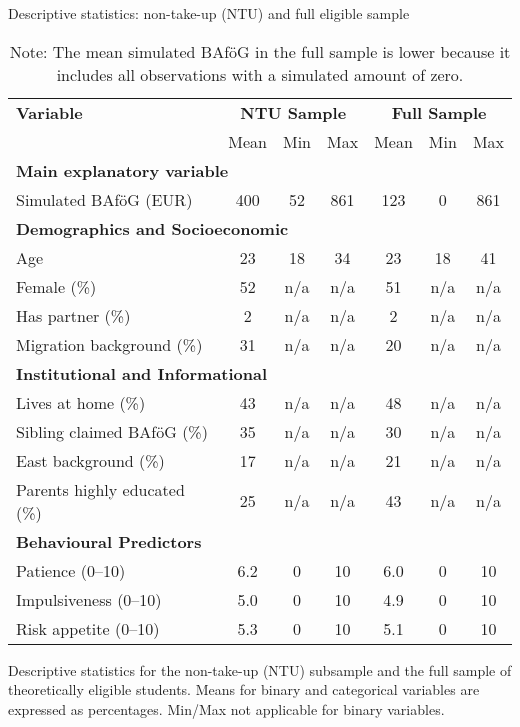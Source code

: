 \begin{table}[H]
\footnotesize
\caption*{Descriptive statistics: non-take-up (NTU) and full eligible sample}
\centering
\begin{tabular}{p{8cm}ccc|ccc}
\toprule
\textbf{Variable} & \multicolumn{3}{c|}{\textbf{NTU Sample}} & \multicolumn{3}{c}{\textbf{Full Sample}} \\
& Mean & Min & Max & Mean & Min & Max \\
\midrule
\multicolumn{7}{l}{\textbf{Main explanatory variable}} \\
Simulated BAföG (EUR)       & 400    & 52    & 861   & 123    & 0    & 861   \\
\midrule
\multicolumn{6}{l}{\textbf{Demographics and Socioeconomic}} \\
Age                         & 23     & 18    & 34    & 23     & 18   & 41    \\
Female (\%)                 & 52     & n/a   & n/a   & 51     & n/a  & n/a   \\
Has partner (\%)            & 2      & n/a   & n/a   & 2      & n/a  & n/a   \\
Migration background (\%)   & 31     & n/a   & n/a   & 20     & n/a  & n/a   \\
\midrule
\multicolumn{6}{l}{\textbf{Institutional and Informational}} \\
Lives at home (\%)          & 43     & n/a   & n/a   & 48     & n/a  & n/a   \\
Sibling claimed BAföG (\%)  & 35     & n/a   & n/a   & 30     & n/a  & n/a   \\
East background (\%)        & 17     & n/a   & n/a   & 21     & n/a  & n/a   \\
Parents highly educated (\%)& 25     & n/a   & n/a   & 43     & n/a  & n/a   \\
\midrule
\multicolumn{6}{l}{\textbf{Behavioural Predictors}} \\
Patience (0--10)            & 6.2    & 0     & 10    & 6.0    & 0    & 10    \\
Impulsiveness (0--10)       & 5.0    & 0     & 10    & 4.9    & 0    & 10    \\
Risk appetite (0--10)       & 5.3    & 0     & 10    & 5.1    & 0    & 10    \\
\bottomrule
\end{tabular}
\caption{\small{Descriptive statistics for the non-take-up (NTU) subsample and the full sample of theoretically eligible students. Means for binary and categorical variables are expressed as percentages. Min/Max not applicable for binary variables.}}
\caption*{\small{Note: The mean simulated BAföG in the full sample is lower because it includes all observations with a simulated amount of zero.}}
\label{tab:descriptive_ntu_all}
\end{table}
